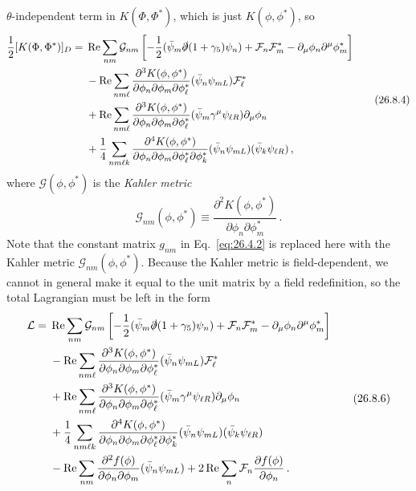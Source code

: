 \(\theta\)-independent term in \(K(\Phi,\Phi^*)\), which is just
\(K(\phi,\phi^*)\), so
\begin{equation}
  \begin{aligned}
  \frac12[K(\Phi,\Phi^*)]_D
  ={}&
  \operatorname{Re}\sum_{nm}\mathcal{G}_{nm}
  \left[
    -\frac12(\bar\psi_m\sl{\partial}(1+\gamma_5)\psi_n)
    +\mathcal{F}_n\mathcal{F}_m^*
    -\partial_\mu\phi_n\partial^\mu\phi_m^*
  \right]
  \\
  &-\operatorname{Re}\sum_{nm\ell}
    \frac{\partial^3K(\phi,\phi^*)}
         {\partial\phi_n\partial\phi_m\partial\phi_\ell^*}
    (\bar\psi_n\psi_{mL})\mathcal{F}_\ell^*
  \\
  &+\operatorname{Re}\sum_{nm\ell}
    \frac{\partial^3K(\phi,\phi^*)}
         {\partial\phi_n\partial\phi_m\partial\phi_\ell^*}
    (\bar\psi_m\gamma^\mu\psi_{\ell R})\partial_\mu\phi_n
  \\
  &+\frac14\sum_{nm\ell k}
    \frac{\partial^4K(\phi,\phi^*)}
         {\partial\phi_n\partial\phi_m
          \partial\phi_\ell^*\partial\phi_k^*}
    (\bar\psi_n\psi_{mL})(\bar\psi_k\psi_{\ell R})\,,
  \end{aligned}
  \tag{26.8.4}\label{eq:26.8.4}
\end{equation}
where \(\mathcal{G}(\phi,\phi^*)\) is the \textit{Kahler metric}
\begin{equation}
  \mathcal{G}_{nm}(\phi,\phi^*)
  \equiv
  \frac{\partial^2K(\phi,\phi^*)}
       {\partial\phi_n\partial\phi_m^*}\,.
  \tag{26.8.5}\label{eq:26.8.5}
\end{equation}
Note that the constant matrix \(g_{nm}\) in Eq.~\eqref{eq:26.4.2} is replaced
here with the Kahler metric \(\mathcal{G}_{nm}(\phi,\phi^*)\). Because the
Kahler metric is field-dependent, we cannot in general make it equal to the
unit matrix by a field redefinition, so the total Lagrangian must be left in
the form
\begin{equation}
  \begin{aligned}
  \mathcal{L}={}&
  \operatorname{Re}\sum_{nm}\mathcal{G}_{nm}
  \left[
    -\frac12(\bar\psi_m\sl{\partial}(1+\gamma_5)\psi_n)
    +\mathcal{F}_n\mathcal{F}_m^*
    -\partial_\mu\phi_n\partial^\mu\phi_m^*
  \right]
  \\
  &-\operatorname{Re}\sum_{nm\ell}
    \frac{\partial^3K(\phi,\phi^*)}
         {\partial\phi_n\partial\phi_m\partial\phi_\ell^*}
    (\bar\psi_n\psi_{mL})\mathcal{F}_\ell^*
  \\
  &+\operatorname{Re}\sum_{nm\ell}
    \frac{\partial^3K(\phi,\phi^*)}
         {\partial\phi_n\partial\phi_m\partial\phi_\ell^*}
    (\bar\psi_m\gamma^\mu\psi_{\ell R})\partial_\mu\phi_n
  \\
  &+\frac14\sum_{nm\ell k}
    \frac{\partial^4K(\phi,\phi^*)}
         {\partial\phi_n\partial\phi_m
          \partial\phi_\ell^*\partial\phi_k^*}
    (\bar\psi_n\psi_{mL})(\bar\psi_k\psi_{\ell R})
  \\
  &-\operatorname{Re}\sum_{nm}
    \frac{\partial^2f(\phi)}{\partial\phi_n\partial\phi_m}
    (\bar\psi_n\psi_{mL})
  +2\operatorname{Re}\sum_n
    \mathcal{F}_n\frac{\partial f(\phi)}{\partial\phi_n}\,.
  \end{aligned}
  \tag{26.8.6}\label{eq:26.8.6}
\end{equation}
